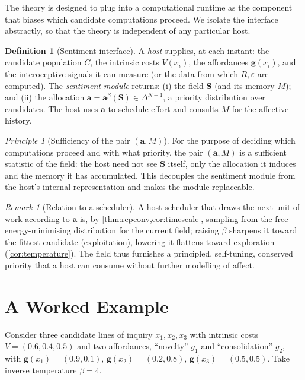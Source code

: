 \documentclass[11pt,a4paper]{article}
\theoremstyle{plain}
\theoremstyle{definition}
\newtheorem{definition}[theorem]{Definition}
\theoremstyle{remark}
\newtheorem{remark}[theorem]{Remark}
\newtheorem{principle}[theorem]{Principle}
\newcommand{\simplex}{\Delta}                 %
\newcommand{\field}{\mathbf{S}}               %
\newcommand{\alloc}{\mathbf{a}}               %
\newcommand{\feat}{\mathbf{g}}                %
\newcommand{\coh}{R}                           %
\begin{document}
The theory is designed to plug into a computational runtime as the component
that biases which candidate computations proceed. We isolate the interface
abstractly, so that the theory is independent of any particular host.

\begin{definition}[Sentiment interface]
\label{def:interface}
A \emph{host} supplies, at each instant: the candidate population $C$, the
intrinsic costs $V(x_i)$, the affordances $\feat(x_i)$, and the interoceptive
signals it can measure (or the data from which $\coh,\varepsilon$ are computed).
The \emph{sentiment module} returns: (i) the field $\field$ (and its memory
$M$); and (ii) the allocation $\alloc=\alloc^\beta(\field)\in\simplex^{N-1}$, a
priority distribution over candidates. The host uses $\alloc$ to schedule
effort and consults $M$ for the affective history.
\end{definition}

\begin{principle}[Sufficiency of the pair $(\alloc,M)$]
\label{prin:sufficiency}
For the purpose of deciding which computations proceed and with what priority,
the pair $(\alloc,M)$ is a sufficient statistic of the field: the host need not
see $\field$ itself, only the allocation it induces and the memory it has
accumulated. This decouples the sentiment module from the host's internal
representation and makes the module replaceable.
\end{principle}

\begin{remark}[Relation to a scheduler]
A host scheduler that draws the next unit of work according to $\alloc$ is,
by \cref{thm:repconv,cor:timescale}, sampling from the free-energy-minimising
distribution for the current field; raising $\beta$ sharpens it toward the
fittest candidate (exploitation), lowering it flattens toward exploration
(\cref{cor:temperature}). The field thus furnishes a principled,
self-tuning, conserved priority that a host can consume without further
modelling of affect.
\end{remark}

\section{A Worked Example}
\label{sec:example}

Consider three candidate lines of inquiry $x_1,x_2,x_3$ with intrinsic costs
$V=(0.6,0.4,0.5)$ and two affordances, ``novelty'' $g_1$ and ``consolidation''
$g_2$, with $\feat(x_1)=(0.9,0.1)$, $\feat(x_2)=(0.2,0.8)$,
$\feat(x_3)=(0.5,0.5)$. Take inverse temperature $\beta=4$.
\end{document}
